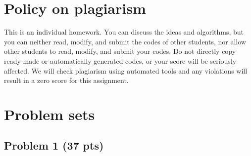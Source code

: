 \documentclass[11pt,letterpaper]{article}
\begin{document}
\section{Policy on plagiarism}
This is an individual homework. You can discuss the ideas and algorithms, but you can neither read, modify, and submit the codes of other students, nor allow other students to read, modify, and submit your codes. Do not directly copy ready-made or automatically generated codes, or your score will be seriously affected. We will check plagiarism using automated tools and any violations will result in a zero score for this assignment. 

\clearpage

\section{Problem sets}


\subsection*{Problem 1 (37 pts)}
\end{document}
